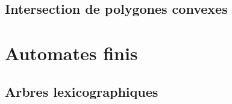 \documentclass{article}
\begin{document}
\subsection{Intersection de polygones convexes}


\section{Automates finis}
\subsection{Arbres lexicographiques}





\label{lastpage}
\end{document}
